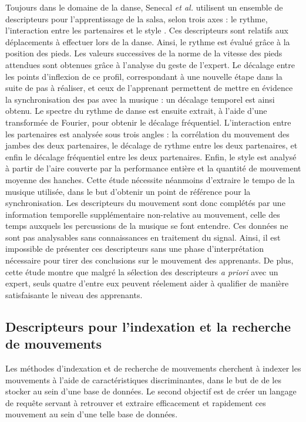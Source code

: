 Toujours dans le domaine de la danse, Senecal \textit{et al.} utilisent un ensemble de descripteurs pour l'apprentissage de la salsa, selon trois axes : le rythme, l'interaction entre les partenaires et le style \parencite{Senecal2018MAa}. Ces descripteurs sont relatifs aux déplacements à effectuer lors de la danse. Ainsi, le rythme est évalué grâce à la position des pieds. Les valeurs successives de la norme de la vitesse des pieds attendues sont obtenues grâce à l'analyse du geste de l'expert. Le décalage entre les points d'inflexion de ce profil, correspondant à une nouvelle étape dans la suite de pas à réaliser, et ceux de l'apprenant permettent de mettre en évidence la synchronisation des pas avec la musique : un décalage temporel est ainsi obtenu. Le spectre du rythme de danse est ensuite extrait, à l'aide d'une transformée de Fourier, pour obtenir le décalage fréquentiel. L'interaction entre les partenaires est analysée sous trois angles : la corrélation du mouvement des jambes des deux partenaires, le décalage de rythme entre les deux partenaires, et enfin le décalage fréquentiel entre les deux partenaires. Enfin, le style est analysé à partir de l'aire couverte par la performance entière et la quantité de mouvement moyenne des hanches. Cette étude nécessite néanmoins d'extraire le tempo de la musique utilisée, dans le but d'obtenir un point de référence pour la synchronisation. Les descripteurs du mouvement sont donc complétés par une information temporelle supplémentaire non-relative au mouvement, celle des temps auxquels les percussions de la musique se font entendre. Ces données ne sont pas analysables sans connaissances en traitement du signal. Ainsi, il est impossible de présenter ces descripteurs sans une phase d'interprétation nécessaire pour tirer des conclusions sur le mouvement des apprenants. De plus, cette étude montre que malgré la sélection des descripteurs \textit{a priori} avec un expert, seuls quatre d'entre eux peuvent réelement aider à qualifier de manière satisfaisante le niveau des apprenants.

\subsection{Descripteurs pour l'indexation et la recherche de mouvements}
Les méthodes d'indexation et de recherche de mouvements cherchent à indexer les mouvements à l'aide de caractéristiques discriminantes, dans le but de de les stocker au sein d'une base de données. Le second objectif est de créer un langage de requête servant à retrouver et extraire efficacement et rapidement ces mouvement au sein d'une telle base de données.

